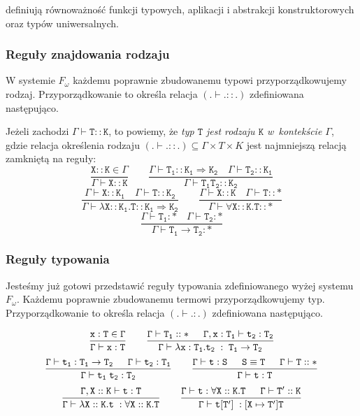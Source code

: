 \documentclass[11pt,leqno]{article}
\begin{document}
definiują równoważność funkcji typowych, aplikacji i abstrakcji konstruktorowych oraz typów uniwersalnych.

\subsubsection{Reguły znajdowania rodzaju}

W systemie $F_\omega$ każdemu poprawnie zbudowanemu typowi przyporządkowujemy rodzaj.
Przyporządkowanie to określa relacja $(.\vdash.::.)$ zdefiniowana następująco.

Jeżeli zachodzi $\mathtt{\Gamma \vdash T :: K}$, to powiemy, że
\emph {typ $\mathtt{T}$ jest rodzaju $\mathtt{K}$ w~kontekście $\mathtt{\Gamma}$}, gdzie
relacja określenia rodzaju $(.\vdash.::.) \subseteq \Gamma \times T \times K$
jest najmniejszą relacją zamkniętą na reguły:
	\[ \mathtt{
		\frac{X::K \in \Gamma}{\Gamma \vdash X::K}
		\qquad
		\frac{\Gamma \vdash T_1 :: K_{1} \Rightarrow K_{2} \hspace{1em} \Gamma \vdash T_2 :: K_{1}}{\Gamma \vdash T_1 T_2 :: K_{2}}}
	\]
	\[ \mathtt{
		\frac{\Gamma \vdash X :: K_1 \hspace{1em} \Gamma \vdash T :: K_2}{\Gamma \vdash \lambda X::K_1. T :: K_{1} \Rightarrow K_{2}}
		\qquad
		\frac{\Gamma \vdash X :: K \hspace{1em} \Gamma \vdash T :: \ast}{\Gamma \vdash \forall X::K. T :: \ast}}
	\]
	\[\mathtt{
		\frac{\Gamma \vdash T_1 : \ast \hspace{1em} \Gamma \vdash T_2 : \ast}{\Gamma \vdash T_1 \rightarrow T_2 : \ast}}
	\]	


\subsubsection{Reguły typowania}

Jesteśmy już gotowi przedstawić reguły typowania zdefiniowanego wyżej systemu $F_\omega$.
Każdemu poprawnie zbudowanemu termowi przyporządkowujemy typ. Przyporządkowanie to określa relacja $(.\vdash.:.)$ zdefiniowana następująco.

	\[\mathtt{
		\frac{x:T \in \Gamma}{\Gamma \vdash x:T}
                \qquad
                \frac{\Gamma \vdash T_1::\ast \hspace{1.5em} \Gamma,x:T_1 \vdash t_2:T_2}{\Gamma \vdash \lambda x:T_1.t_2\;:\;T_1 \rightarrow T_2}}
	\]
	\[\mathtt{
		\frac{\Gamma \vdash t_1:T_1 \rightarrow T_2 \hspace{1.5em} \Gamma \vdash t_2:T_1}{ \Gamma \vdash t_1 \; t_2 : T_2}
                \qquad
                \frac{\Gamma \vdash t:S \hspace{1.5em} S \equiv T \hspace{1.5em} \Gamma \vdash T::\ast}{\Gamma \vdash t:T}}
	\]
	\[\mathtt{
		\frac{\Gamma,X::K \vdash t:T }{\Gamma \vdash \lambda X::K.t \;:\forall X::K.T}
                \qquad
                \frac{\Gamma \vdash t:\forall X::K.T \hspace{1.5em} \Gamma \vdash T'::K}{\Gamma \vdash t[T']\;:[X \mapsto T']T}}
	\]
\end{document}
